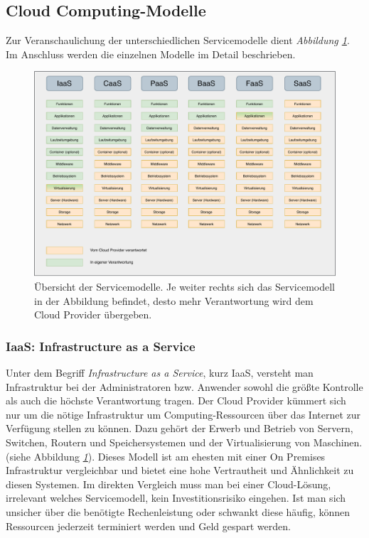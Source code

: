 \clearpage

\subsection{Cloud Computing-Modelle}
\label{Servicemodelle}
Zur Veranschaulichung der unterschiedlichen Servicemodelle dient \textit{Abbildung \ref{fig:Servicemodelle}}.
Im Anschluss werden die einzelnen Modelle im Detail beschrieben.


\begin{figure}[htbp]
    \centering
    \includegraphics[width=1.0\textwidth]{30-Serverless-Theorie/ServiceModelle.pdf}
    \caption{Übersicht der Servicemodelle. Je weiter rechts sich das Servicemodell in der Abbildung befindet, desto mehr Verantwortung wird dem Cloud Provider übergeben. }
    \label{fig:Servicemodelle}
\end{figure}


   \subsubsection{IaaS: Infrastructure as a Service}
   Unter dem Begriff \textsl{Infrastructure as a Service}, kurz IaaS, versteht man Infrastruktur bei der Administratoren bzw. Anwender sowohl die größte Kontrolle als auch die höchste Verantwortung tragen.
   Der Cloud Provider kümmert sich nur um die nötige Infrastruktur um Computing-Ressourcen über das Internet zur Verfügung stellen zu können.
   Dazu gehört der Erwerb und Betrieb von Servern, Switchen, Routern und Speichersystemen und der Virtualisierung von Maschinen.(siehe Abbildung \textit{\ref{fig:Servicemodelle}}).
   Dieses Modell ist am ehesten mit einer On Premises Infrastruktur vergleichbar und bietet eine hohe Vertrautheit und Ähnlichkeit zu diesen Systemen.
   Im direkten Vergleich muss man bei einer Cloud-Lösung, irrelevant welches Servicemodell, kein Investitionsrisiko eingehen.
   Ist man sich unsicher über die benötigte Rechenleistung oder schwankt diese häufig, können Ressourcen jederzeit terminiert werden und Geld gespart werden.


